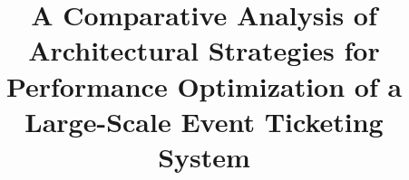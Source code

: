 \documentclass[conference,a4paper,english]{IEEEtran}
\begin{document}
\title{A Comparative Analysis of Architectural Strategies for Performance Optimization of a Large-Scale Event Ticketing System
}



\maketitle







\printbibliography
\end{document}
